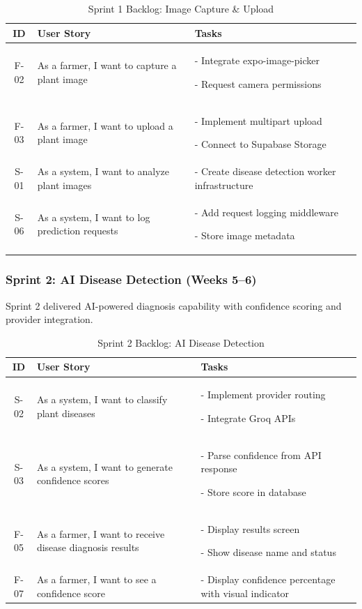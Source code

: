 \documentclass[12pt]{article}
\begin{document}
\begin{table}[H]
\centering
\caption{Sprint 1 Backlog: Image Capture \& Upload}
\label{tab:sprint1}
\begin{tabular}{|c|p{8cm}|p{8cm}|}
\hline
\textbf{ID} & \textbf{User Story} & \textbf{Tasks} \\
\hline
F-02 & As a farmer, I want to capture a plant image & - Integrate expo-image-picker \par - Request camera permissions \\
\hline
F-03 & As a farmer, I want to upload a plant image & - Implement multipart upload \par - Connect to Supabase Storage \\
\hline
S-01 & As a system, I want to analyze plant images & - Create disease detection worker infrastructure \\
\hline
S-06 & As a system, I want to log prediction requests & - Add request logging middleware \par - Store image metadata \\
\hline
\end{tabular}
\end{table}

\subsubsection*{Sprint 2: AI Disease Detection (Weeks 5--6)}
Sprint 2 delivered AI-powered diagnosis capability with confidence scoring and provider integration.

\begin{table}[H]
\centering
\caption{Sprint 2 Backlog: AI Disease Detection}
\label{tab:sprint2}
\begin{tabular}{|c|p{8cm}|p{8cm}|}
\hline
\textbf{ID} & \textbf{User Story} & \textbf{Tasks} \\
\hline
S-02 & As a system, I want to classify plant diseases & - Implement provider routing \par - Integrate Groq APIs \\
\hline
S-03 & As a system, I want to generate confidence scores & - Parse confidence from API response \par - Store score in database \\
\hline
F-05 & As a farmer, I want to receive disease diagnosis results & - Display results screen \par - Show disease name and status \\
\hline
F-07 & As a farmer, I want to see a confidence score & - Display confidence percentage with visual indicator \\
\hline
\end{tabular}
\end{table}
\end{document}
